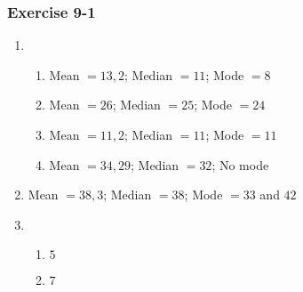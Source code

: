 {\begin{multicols}{3}
\subsubsection*{Exercise 9-1} %
\begin{enumerate}[noitemsep, label=\textbf{\arabic*}.]
\item %
\begin{enumerate}[noitemsep, label=\textbf{(\alph*)} ]
\item Mean $= 13,2$; Median $= 11$; Mode $= 8$ %
\item Mean $= 26$; Median $= 25$; Mode $= 24$%
\item Mean $=11,2$; Median $= 11$; Mode $=11$%
\item Mean $=34,29$; Median $=32$; No mode%
\end{enumerate}
\item Mean $=38,3$; Median $= 38$; Mode $= 33$ and $42$%
\item %
\begin{enumerate}[noitemsep, label=\textbf{(\alph*)} ]
  \item $5$%
  \item $7$%
  \end{enumerate}




\end{enumerate}
\end{multicols}}
